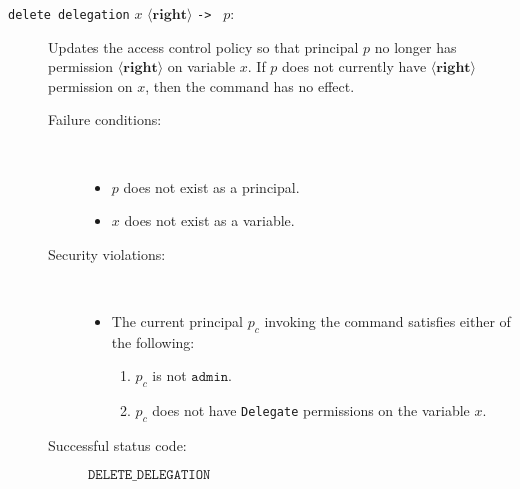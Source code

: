 \documentclass[11pt]{article}
\begin{document}
\begin{description}
\item[\texttt{delete delegation} $x$ $\langle\mathbf{right}\rangle$ \texttt{->\ } $p$:] Updates the access control policy so that principal $p$ no longer has permission $\langle\mathbf{right}\rangle$ on variable $x$. If $p$ does not currently have $\langle\mathbf{right}\rangle$ permission on $x$, then the command has no effect.
\begin{description}
\item[Failure conditions:]\ \\[-1.5em]
\begin{itemize}
\item $p$ does not exist as a principal.
\item $x$ does not exist as a variable.
\end{itemize}
\item[Security violations:]\ \\[-1.5em]
\begin{itemize}
\item The current principal $p_c$ invoking the command satisfies either of the following:
\begin{enumerate} 
\item $p_c$ is not $\mathtt{admin}$.
\item $p_c$ does not have \texttt{Delegate} permissions on the variable $x$.
\end{enumerate}
\end{itemize}
\item[Successful status code:] $\mathtt{DELETE\_DELEGATION}$
\end{description}
\end{description}
\end{document}
